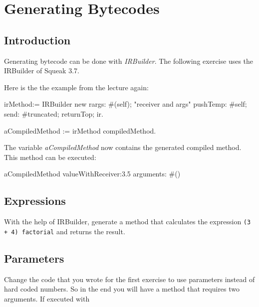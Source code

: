 
\ifx\wholebook\relax\else


\fi



\chapter{Generating Bytecodes}


\section*{Introduction}

Generating bytecode can be done with {\em IRBuilder}. The following exercise uses the IRBuilder
of Squeak 3.7.

Here is the the example from the lecture again: 

\begin{scode}
irMethod:= IRBuilder new
  rargs: #(self);      "receiver and args"
  pushTemp: #self;	
  send: #truncated;
  returnTop;
  ir.
  
aCompiledMethod  := irMethod compiledMethod.
\end{scode}

The variable {\em aCompiledMethod} now contains the generated compiled method. This method can
be executed:

\begin{scode}
aCompiledMethod valueWithReceiver:3.5 arguments: #()
\end{scode}

\section{Expressions}
With the help of IRBuilder, generate a method that calculates the
expression {\tt (3 + 4) factorial} and returns the result.



\section{Parameters}
Change the code that you wrote for the first exercise to use parameters
instead of hard coded numbers. So in the end you will have a method
that requires two arguments. If executed with 

